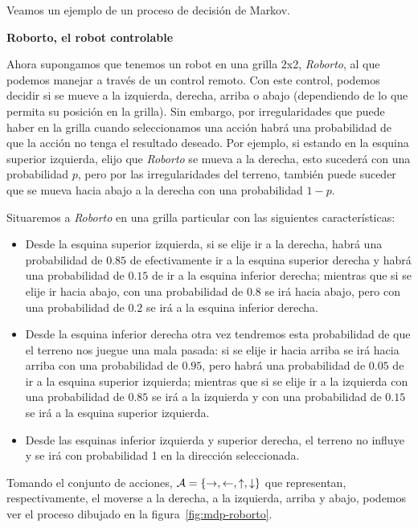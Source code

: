 Veamos un ejemplo de un proceso de decisión de Markov.

\textbf{Roborto, el robot controlable}

Ahora supongamos que tenemos un robot en una grilla 2x2, \emph{Roborto}, al que
podemos manejar a través de un control remoto. Con este control, podemos
decidir si se mueve a la izquierda, derecha, arriba o abajo (dependiendo de lo
que permita su posición en la grilla). Sin embargo, por irregularidades que
puede haber en la grilla cuando seleccionamos una acción habrá una probabilidad
de que la acción no tenga el resultado deseado. Por ejemplo, si estando en la
esquina superior izquierda, elijo que \emph{Roborto} se mueva a la derecha,
esto sucederá con una probabilidad $p$, pero por las irregularidades del
terreno, también puede suceder que se mueva hacia abajo a la derecha con una
probabilidad $1 - p$.

Situaremos a \emph{Roborto} en una grilla particular con las siguientes
características:

\begin{itemize}
	\item Desde la esquina superior izquierda, si se elije ir a la derecha, habrá una
	      probabilidad de $0.85$ de efectivamente ir a la esquina superior derecha y
	      habrá una probabilidad de $0.15$ de ir a la esquina inferior derecha; mientras
	      que si se elije ir hacia abajo, con una probabilidad de $0.8$ se irá hacia
	      abajo, pero con una probabilidad de $0.2$ se irá a la esquina inferior derecha.
	\item Desde la esquina inferior derecha otra vez tendremos esta probabilidad de que
	      el terreno nos juegue una mala pasada: si se elije ir hacia arriba se irá hacia
	      arriba con una probabilidad de $0.95$, pero habrá una probabilidad de $0.05$ de
	      ir a la esquina superior izquierda; mientras que si se elije ir a la izquierda
	      con una probabilidad de $0.85$ se irá a la izquierda y con una probabilidad de
	      $0.15$ se irá a la esquina superior izquierda.
	\item Desde las esquinas inferior izquierda y superior derecha, el terreno no influye
	      y se irá con probabilidad 1 en la dirección seleccionada.
\end{itemize}

Tomando el conjunto de acciones, $\mathcal{A} = \{\rightarrow, \leftarrow, \uparrow,
	\downarrow\}$ que representan, respectivamente, el moverse a la derecha, a la
izquierda, arriba y abajo, podemos ver el proceso dibujado en la
figura~\ref{fig:mdp-roborto}.

